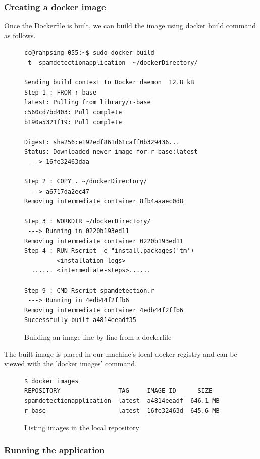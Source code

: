 \documentclass[9pt,twocolumn,twoside]{../../styles/osajnl}
\begin{document}
\subsubsection{Creating a docker image}
Once the Dockerfile is built, we can build the image using docker
build command as follows.
\begin{figure}[h]
\begin{verbatim}
cc@rahpsing-055:~$ sudo docker build 
-t  spamdetectionapplication  ~/dockerDirectory/

Sending build context to Docker daemon  12.8 kB
Step 1 : FROM r-base
latest: Pulling from library/r-base
c560cd7bd403: Pull complete 
b190a5321f19: Pull complete 

Digest: sha256:e192edf861d61caff0b329436...
Status: Downloaded newer image for r-base:latest
 ---> 16fe32463daa

Step 2 : COPY . ~/dockerDirectory/
 ---> a6717da2ec47
Removing intermediate container 8fb4aaaec0d8

Step 3 : WORKDIR ~/dockerDirectory/
 ---> Running in 0220b193ed11
Removing intermediate container 0220b193ed11
Step 4 : RUN Rscript -e "install.packages('tm')
         <installation-logs>
  ...... <intermediate-steps>......

Step 9 : CMD Rscript spamdetection.r
 ---> Running in 4edb44f2ffb6
Removing intermediate container 4edb44f2ffb6
Successfully built a4814eeadf35
\end{verbatim}
\caption{Building an image line by line from a dockerfile}
\label{Building an image from a dockerfile}
\end{figure}

\noindent
The built image is placed in our machine's local docker registry and
can be viewed with the 'docker images' command.

\begin{figure}[H]
\begin{verbatim}
$ docker images
REPOSITORY                TAG     IMAGE ID      SIZE
spamdetectionapplication  latest  a4814eeadf  646.1 MB
r-base                    latest  16fe32463d  645.6 MB
\end{verbatim}                   
\caption{Listing images in the local repository}
\label{Listing images in the local repository}
\end{figure}

\subsubsection{Running the application}
\end{document}
